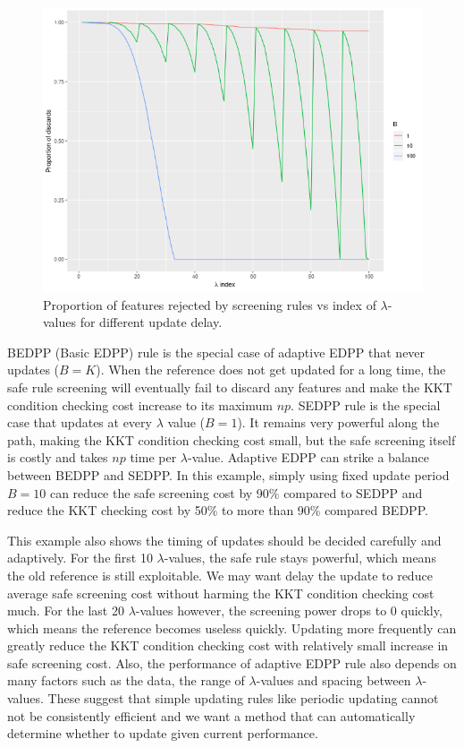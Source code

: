 \documentclass{article}
\begin{document}
\begin{figure}[H]
    \centering
    \includegraphics[scale = 0.5]{plots/batchsizes.png}    \caption{Proportion of features rejected by screening rules vs index of $\lambda$-values for different update delay.}
    \label{fig:3.4.1}
\end{figure}

BEDPP (Basic EDPP) rule is the special case of adaptive EDPP that never updates ($B=K$). When the reference does not get updated for a long time, the safe rule screening will eventually fail to discard any features and make the KKT condition checking cost increase to its maximum $np$. SEDPP rule is the special case that updates at every $\lambda$ value ($B=1$). It remains very powerful along the path, making the KKT condition checking cost small, but the safe screening itself is costly and takes $np$ time per $\lambda$-value. Adaptive EDPP can strike a balance between BEDPP and SEDPP. In this example, simply using fixed update period $B=10$ can reduce the safe screening cost by 90\% compared to SEDPP and reduce the KKT checking cost by 50\% to more than 90\% compared BEDPP.

This example also shows the timing of updates should be decided carefully and adaptively. For the first 10 $\lambda$-values, the safe rule stays powerful, which means the old reference is still exploitable. We may want delay the update to reduce average safe screening cost without harming the KKT condition checking cost much. For the last 20 $\lambda$-values however, the screening power drops to 0 quickly, which means the reference becomes useless quickly. Updating more frequently can greatly reduce the KKT condition checking cost with relatively small increase in safe screening cost. Also, the performance of adaptive EDPP rule also depends on many factors such as the data, the range of $\lambda$-values and spacing between $\lambda$-values. These suggest that simple updating rules like periodic updating cannot not be consistently efficient and we want a method that can automatically determine whether to update given current performance.
\end{document}
